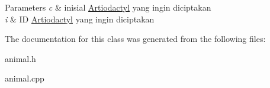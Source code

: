 \begin{DoxyParams}{Parameters}
{\em c} & inisial \hyperlink{classArtiodactyl}{Artiodactyl} yang ingin diciptakan \\
\hline
{\em i} & ID \hyperlink{classArtiodactyl}{Artiodactyl} yang ingin diciptakan \\
\hline
\end{DoxyParams}


The documentation for this class was generated from the following files\+:\begin{DoxyCompactItemize}
\item 
animal.\+h\item 
animal.\+cpp\end{DoxyCompactItemize}
